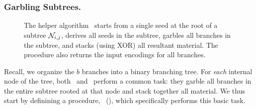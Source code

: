\subsubsection{Garbling Subtrees.}
\begin{figure}[t!]\centering{}
  \caption{%
    The helper algorithm \gbtree\ starts from a single seed
    at the root of a subtree $\mathtt{\cal N}_{i,j}$, derives all seeds in the
    subtree, garbles all branches in the subtree, and stacks (using
    XOR) all resultant material. The procedure also returns the input
    encodings for all branches.
  }\label{fig:gbtree}
\end{figure}

Recall, we organize the $b$ branches into a binary branching tree.
For \emph{each} internal node of the tree, both \evcond\ and \gbcond\
perform a common task: they garble all branches in the entire subtree
rooted at that node and stack together all material.
%
We thus start by definining a procedure, \gbtree~(),
which specifically performs this basic task.

